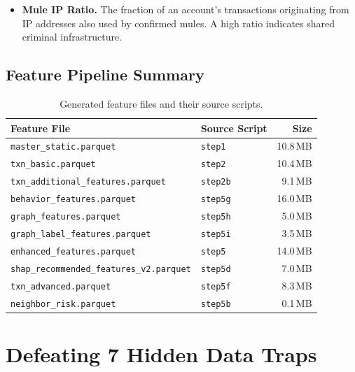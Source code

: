 \documentclass[11pt, a4paper]{article}
\begin{document}
\begin{itemize}[leftmargin=1.5em, itemsep=4pt]
    \item \textbf{Mule IP Ratio.}\quad
          The fraction of an account's transactions originating from IP addresses also used
          by confirmed mules. A high ratio indicates shared criminal infrastructure.
\end{itemize}

\subsection{Feature Pipeline Summary}

\begin{table}[H]
\centering\small
\caption{Generated feature files and their source scripts.}
\begin{tabular}{@{}llr@{}}
\toprule
\textbf{Feature File} & \textbf{Source Script} & \textbf{Size} \\
\midrule
\texttt{master\_static.parquet}                   & \texttt{step1}  & 10.8\,MB \\
\texttt{txn\_basic.parquet}                       & \texttt{step2}  & 10.4\,MB \\
\texttt{txn\_additional\_features.parquet}        & \texttt{step2b} & 9.1\,MB \\
\texttt{behavior\_features.parquet}               & \texttt{step5g} & 16.0\,MB \\
\texttt{graph\_features.parquet}                  & \texttt{step5h} & 5.0\,MB \\
\texttt{graph\_label\_features.parquet}           & \texttt{step5i} & 3.5\,MB \\
\texttt{enhanced\_features.parquet}               & \texttt{step5}  & 14.0\,MB \\
\texttt{shap\_recommended\_features\_v2.parquet}  & \texttt{step5d} & 7.0\,MB \\
\texttt{txn\_advanced.parquet}                    & \texttt{step5f} & 8.3\,MB \\
\texttt{neighbor\_risk.parquet}                   & \texttt{step5b} & 0.1\,MB \\
\bottomrule
\end{tabular}
\end{table}


\section{Defeating 7 Hidden Data Traps}
\end{document}
